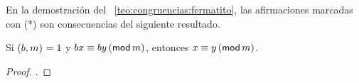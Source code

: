 En la demostraci\'on del \teoname~\ref{teo:congruencias:fermatito}, las
afirmaciones marcadas con (*) son consecuencias del siguiente resultado.

\begin{lemaCongruencias}\label{lema:congruencias:cancelable}
	Si $\mcd{b,m}=1$ y $bx\equiv by\tmodulo[m]$, entonces
	$x\equiv y\tmodulo[m]$.
\end{lemaCongruencias}

\begin{proof}
	\quedacomoejercicio.
\end{proof}

